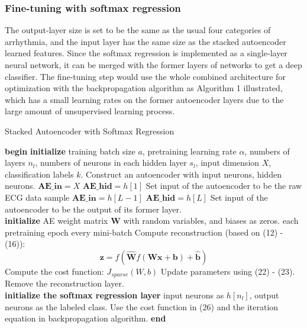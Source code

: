 \documentclass[journal]{IEEEtran}
\begin{document}
\subsubsection{Fine-tuning with softmax regression}
The output-layer size is set to be the same as the usual four categories of arrhythmia, and the input layer has the same size as the stacked autoencoder learned features. Since the softmax regression is implemented as a single-layer neural network, it can be merged with the former layers of networks to get a deep classifier. The fine-tuning step would use the whole combined architecture for optimization with the backpropagation algorithm as Algorithm 1 illustrated, which has a small learning rates on the former autoencoder layers due to the large amount of unsupervised learning process.



\begin{algorithm}
\caption{Stacked Autoencoder with  Softmax Regression}
\begin{algorithmic}[1]
\State \textbf{begin}
	\State \textbf{initialize} training batch size $a$, pretraining learning rate $\alpha$, numbers of layers $n_l$, numbers of neurons in each hidden layer $s_l$, input dimension $X$, classification labels $k$.
		\State Construct an autoencoder with  input neurons, hidden neurons.
			\State $\textbf{AE\_in} = X$
			\State $\textbf{AE\_hid} = h[1]$
			\State Set input of the autoencoder to be the raw ECG data sample
		\Else
			\State $\textbf{AE\_in} = h[L-1]$
			\State $\textbf{AE\_hid} =h[L]$
			\State Set input of the autoencoder to be the output of its former layer.
		\EndIf
	\EndFor
\\
	\State \textbf{initialize} AE weight matrix $\mathbf{W}$ with random variables, and biases as zeros.
	\For each pretraining epoch
		\For every mini-batch
			\State Compute reconstruction (based on (12) - (16)):
			\begin{equation}
				\mathbf{z} = f(\hat{\mathbf W}f(\mathbf W\mathbf x+\mathbf b)+\mathbf {\hat{b}})
			\end{equation}
			\State Compute the cost function: $J_{sparse}(W, b)$
			\State Update parameters using (22) - (23).
		\EndFor
	\EndFor
	\State Remove the reconstruction layer.
\\
	\State \textbf{initialize the softmax regression layer} input neurons as $h[n_l]$, output neurons as the labeled class.
			\State Use the cost function in (26) and the iteration equation in backpropagation algorithm.
		\EndFor
	\EndFor
\State \textbf{end}
\end{algorithmic}
\end{algorithm}
\end{document}
